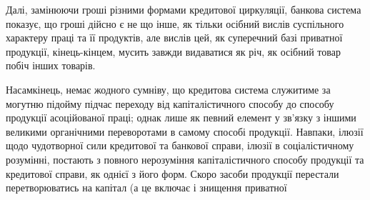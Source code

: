 Далі, замінюючи гроші різними формами кредитової циркуляції, банкова
система показує, що гроші дійсно є не що інше, як тільки осібний вислів суспільного
характеру праці та її продуктів, але вислів цей, як суперечний базі приватної
продукції, кінець-кінцем, мусить завжди видаватися як річ, як осібний
товар побіч інших товарів.

Насамкінець, немає жодного сумніву, що кредитова система служитиме за
могутню підойму підчас переходу від капіталістичного способу до способу продукції
асоційованої праці; однак лише як певний елемент у зв’язку з іншими
великими органічними переворотами в самому способі продукції. Навпаки, ілюзії
щодо чудотворної сили кредитової та банкової справи, ілюзії в соціалістичному
розумінні, постають з повного нерозуміння капіталістичного способу продукції
та кредитової справи, як однієї з його форм. Скоро засоби продукції перестали
перетворюватись на капітал (а це включає і знищення приватної
\parbreak{}  %
